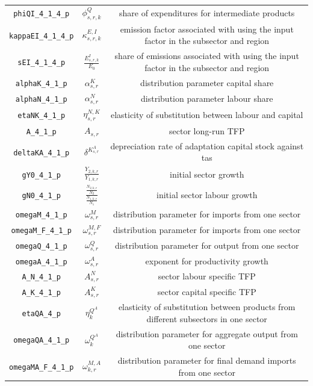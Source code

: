 \begin{center}
\begin{longtable}{ccc}
\texttt{phiQI\_4\_1\_4\_p} & ${\phi^{Q}_{s,r,k}}$ & share of expenditures for intermediate products\\
\texttt{kappaEI\_4\_1\_4\_p} & ${\kappa^{E,I}_{s,r,k}}$ & emission factor associated with using the input factor in the subsector and region\\
\texttt{sEI\_4\_1\_4\_p} & ${\frac{E^{I}_{s,r,k}}{E_0}}$ & share of emissions associated with using the input factor in the subsector and region\\
\texttt{alphaK\_4\_1\_p} & ${\alpha^{K}_{s,r}}$ & distribution parameter capital share\\
\texttt{alphaN\_4\_1\_p} & ${\alpha^{N}_{s,r}}$ & distribution parameter labour share\\
\texttt{etaNK\_4\_1\_p} & ${\eta^{N,K}_{s,r}}$ & elasticity of substitution between labour and capital\\
\texttt{A\_4\_1\_p} & ${A_{s,r}}$ & sector long-run TFP\\
\texttt{deltaKA\_4\_1\_p} & ${\delta^{K^{A}_{s,r}}}$ & depreciation rate of adaptation capital stock against tas\\
\texttt{gY0\_4\_1\_p} & ${\frac{Y_{2,k,r}}{Y_{1,k,r}}}$ & initial sector growth\\
\texttt{gN0\_4\_1\_p} & ${\frac{\frac{N_{2,k,r}}{N_{2}}}{\frac{N_{1,k,r}}{N_{1}}}}$ & initial sector labour growth\\
\texttt{omegaM\_4\_1\_p} & ${\omega^{M}_{s,r}}$ & distribution parameter for imports from one sector\\
\texttt{omegaM\_F\_4\_1\_p} & ${\omega^{M,F}_{s,r}}$ & distribution parameter for imports from one sector\\
\texttt{omegaQ\_4\_1\_p} & ${\omega^{Q}_{s,r}}$ & distribution parameter for output from one sector\\
\texttt{omegaA\_4\_1\_p} & ${\omega^{A}_{s,r}}$ & exponent for productivity growth\\
\texttt{A\_N\_4\_1\_p} & ${A^{N}_{s,r}}$ & sector labour specific TFP\\
\texttt{A\_K\_4\_1\_p} & ${A^{K}_{s,r}}$ & sector capital specific TFP\\
\texttt{etaQA\_4\_p} & ${\eta^{Q^A}_{k}}$ & elasticity of substitution between products from different subsectors in one sector\\
\texttt{omegaQA\_4\_1\_p} & ${\omega^{Q^A}_{k}}$ & distribution parameter for aggregate output from one sector\\
\texttt{omegaMA\_F\_4\_1\_p} & ${\omega^{M,A}_{k,r}}$ & distribution parameter for final demand imports from one sector\\

\end{longtable}
\end{center}
